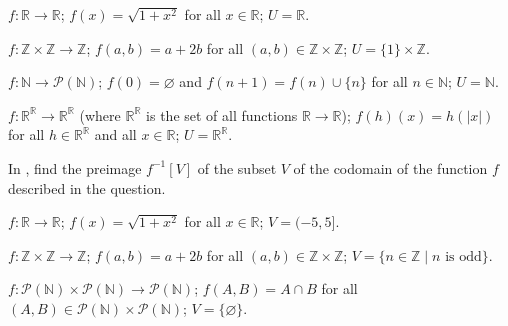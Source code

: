 \begin{chapex}
\label{cqComputeImageBegin}
$f : \mathbb{R} \to \mathbb{R}$; $f(x) = \sqrt{1+x^2}$ for all $x \in \mathbb{R}$; $U = \mathbb{R}$.
\end{chapex}

\begin{chapex}
$f : \mathbb{Z} \times \mathbb{Z} \to \mathbb{Z}$; $f(a,b) = a+2b$ for all $(a,b) \in \mathbb{Z} \times \mathbb{Z}$; $U = \{ 1 \} \times \mathbb{Z}$.
\end{chapex}

\begin{chapex}
$f : \mathbb{N} \to \mathcal{P}(\mathbb{N})$; $f(0) = \varnothing$ and $f(n+1) = f(n) \cup \{ n \}$ for all $n \in \mathbb{N}$; $U = \mathbb{N}$.
\end{chapex}

\begin{chapex}
$f : \mathbb{R}^{\mathbb{R}} \to \mathbb{R}^{\mathbb{R}}$ (where $\mathbb{R}^{\mathbb{R}}$ is the set of all functions $\mathbb{R} \to \mathbb{R}$); $f(h)(x) = h(|x|)$ for all $h \in \mathbb{R}^{\mathbb{R}}$ and all $x \in \mathbb{R}$; $U = \mathbb{R}^{\mathbb{R}}$.
\end{chapex}

In , find the preimage $f^{-1}[V]$ of the subset $V$ of the codomain of the function $f$ described in the question.

\begin{chapex}
\label{cqComputePreimageBegin}
$f : \mathbb{R} \to \mathbb{R}$; $f(x) = \sqrt{1+x^2}$ for all $x \in \mathbb{R}$; $V = (-5,5]$.
\end{chapex}

\begin{chapex}
$f : \mathbb{Z} \times \mathbb{Z} \to \mathbb{Z}$; $f(a,b) = a+2b$ for all $(a,b) \in \mathbb{Z} \times \mathbb{Z}$; $V = \{ n \in \mathbb{Z} \mid n \text{ is odd} \}$.
\end{chapex}

\begin{chapex}
\label{cqComputePreimageEnd}
$f : \mathcal{P}(\mathbb{N}) \times \mathcal{P}(\mathbb{N}) \to \mathcal{P}(\mathbb{N})$; $f(A,B) = A \cap B$ for all $(A,B) \in \mathcal{P}(\mathbb{N}) \times \mathcal{P}(\mathbb{N})$; $V = \{ \varnothing \}$.
\end{chapex}


